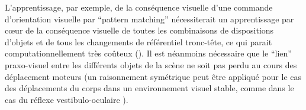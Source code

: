\documentclass[11pt]{article}
\begin{document}
	
L'apprentissage, par exemple, de la conséquence visuelle d'une commande d'orientation visuelle par ``pattern matching'' nécessiterait un apprentissage par cœur de la conséquence visuelle 
de toutes les combinaisons de dispositions d'objets et de tous les changements de référentiel tronc-tête, ce qui parait 
computationnellement très coûteux (). Il est néanmoins nécessaire  que le ``lien'' praxo-visuel entre les différents objets de la scène ne soit pas perdu
au cours des déplacement moteurs
(un raisonnement symétrique peut être appliqué pour le cas des déplacements du corps dans un environnement visuel stable, comme dans le cas du réflexe vestibulo-oculaire \cite{Paillard1978}).	
\end{document}

